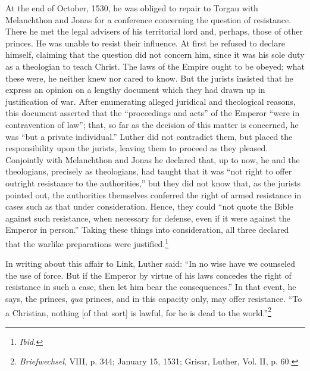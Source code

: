 At the end of October, 1530, he was obliged to repair to Torgau
with Melanchthon and Jonas for a conference concerning the question
of resistance. There he met the legal advisers of his territorial
lord and, perhaps, those of other princes. He was unable to resist
their influence. At first he refused to declare himself, claiming that
the question did not concern him, since it was his sole duty as a
theologian to teach Christ. The laws of the Empire ought to be
obeyed; what these were, he neither knew nor cared to know. But
the jurists insisted that he express an opinion on a lengthy document
which they had drawn up in justification of war.
After enumerating alleged juridical and theological reasons, this document
asserted that the “proceedings and acts” of the Emperor “were in
contravention of law”; that, so far as the decision of this matter is
concerned, he was “but a private individual.” Luther did not contradict
them, but placed the responsibility upon the jurists, leaving
them to proceed as they pleased. Conjointly with Melanchthon and
Jonas he declared that, up to now, he and the theologians, precisely
as theologians, had taught that it was “not right to offer outright
resistance to the authorities,” but they did not know that, as the
jurists pointed out, the authorities themselves conferred the right of
armed resistance in cases such as that under consideration. Hence,
they could “not quote the Bible against such resistance, when necessary
for defense, even if it were against the Emperor in person.”
Taking these things into consideration, all three declared that the
warlike preparations were justified.\footnote{\textit{Ibid.}}

In writing about this affair to Link, Luther said: “In no wise
have we counseled the use of force. But if the Emperor by virtue of
his laws concedes the right of resistance in such a case, then let
him bear the consequences.” In that event, he says, the princes,
\textit{qua} princes, and in this capacity only, may offer resistance. “To
a Christian, nothing [of that sort] is lawful, for he is dead to the
world.”\footnote{\textit{Briefwechsel}, VIII, p. 344; January 15, 1531; Grisar, Luther, Vol. II, p. 60.}


